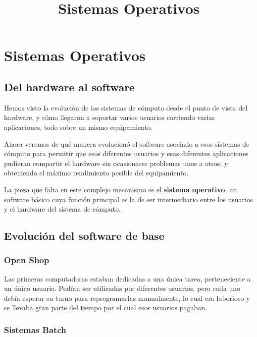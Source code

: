 \documentclass[spanish,a4paper,]{article}
\title{Sistemas Operativos}
\date{}
\begin{document}
\maketitle

\hypertarget{sistemas-operativos}{%
\section{Sistemas Operativos}\label{sistemas-operativos}}

\hypertarget{del-hardware-al-software}{%
\subsection{Del hardware al software}\label{del-hardware-al-software}}

Hemos visto la evolución de los sistemas de cómputo desde el punto de
vista del hardware, y cómo llegaron a soportar varios usuarios corriendo
varias aplicaciones, todo sobre un mismo equipamiento.

Ahora veremos de qué manera evolucionó el software asociado a esos
sistemas de cómputo para permitir que esos diferentes usuarios y esas
diferentes aplicaciones pudieran compartir el hardware sin ocasionarse
problemas unos a otros, y obteniendo el máximo rendimiento posible del
equipamiento.

La pieza que falta en este complejo mecanismo es el \textbf{sistema
operativo}, un software básico cuya función principal es la de ser
intermediario entre los usuarios y el hardware del sistema de cómputo.

\hypertarget{evoluciuxf3n-del-software-de-base}{%
\subsection{Evolución del software de
base}\label{evoluciuxf3n-del-software-de-base}}

\hypertarget{open-shop}{%
\subsubsection{Open Shop}\label{open-shop}}

Las primeras computadoras estaban dedicadas a una única tarea,
perteneciente a un único usuario. Podían ser utilizadas por diferentes
usuarios, pero cada uno debía esperar su turno para reprogramarlas
manualmente, lo cual era laborioso y se llevaba gran parte del tiempo
por el cual esos usuarios pagaban.

\hypertarget{sistemas-batch}{%
\subsubsection{Sistemas Batch}\label{sistemas-batch}}
\end{document}
